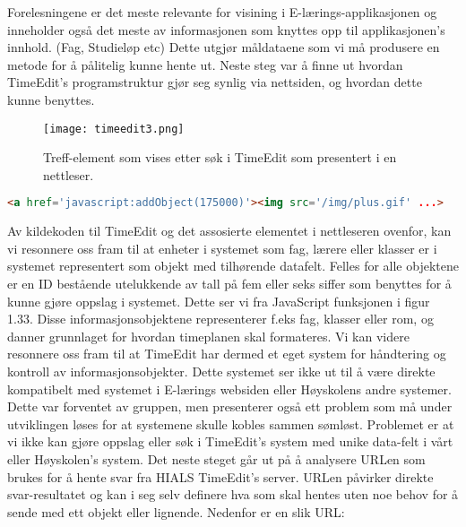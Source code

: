 \documentclass[../main.tex]{subfiles}
\begin{document}
Forelesningene er det meste relevante for visining i E-lærings-applikasjonen og inneholder også det meste av informasjonen som knyttes opp til applikasjonen’s innhold. (Fag, Studieløp etc)
Dette utgjør måldataene som vi må produsere en metode for å pålitelig kunne hente ut.\newline
\newline
Neste steg var å finne ut hvordan TimeEdit’s programstruktur gjør seg synlig via nettsiden, og hvordan dette kunne benyttes.

\begin{figure}[H]
  \centering
  \texttt{[image: timeedit3.png]}
\caption{Treff-element som vises etter søk i TimeEdit som presentert i en nettleser.}
\end{figure}

\begin{lstlisting}[language=HTML, frame=single, caption={Utdrag av kildekoden til TimeEdit's nettside som vist i figur 1.32}, label={lst:timeeditb}]
<a href='javascript:addObject(175000)'><img src='/img/plus.gif' ...>
\end{lstlisting}

Av kildekoden til TimeEdit og det assosierte elementet i nettleseren ovenfor, kan vi resonnere oss fram til at enheter i systemet som fag, lærere eller klasser er i systemet representert som objekt med tilhørende datafelt. Felles for alle objektene er en ID bestående utelukkende av tall på fem eller seks siffer som benyttes for å kunne gjøre oppslag i systemet. Dette ser vi fra JavaScript funksjonen i figur 1.33. Disse informasjonsobjektene representerer f.eks fag, klasser eller rom, og danner grunnlaget for hvordan timeplanen skal formateres. Vi kan videre resonnere oss fram til at TimeEdit har dermed et eget system for håndtering og kontroll av informasjonsobjekter. Dette systemet ser ikke ut til å være direkte kompatibelt med systemet i E-lærings websiden eller Høyskolens andre systemer. Dette var forventet av gruppen, men presenterer også ett problem som må under utviklingen løses for at systemene skulle kobles sammen sømløst. Problemet er at vi ikke kan gjøre oppslag eller søk i TimeEdit's system med unike data-felt i vårt eller Høyskolen's system. \newline
Det neste steget går ut på å analysere URLen som brukes for å hente svar fra HIALS TimeEdit's server. URLen påvirker direkte svar-resultatet og kan i seg selv definere hva som skal hentes uten noe behov for å sende med ett objekt eller lignende. Nedenfor er en slik URL:
\end{document}
